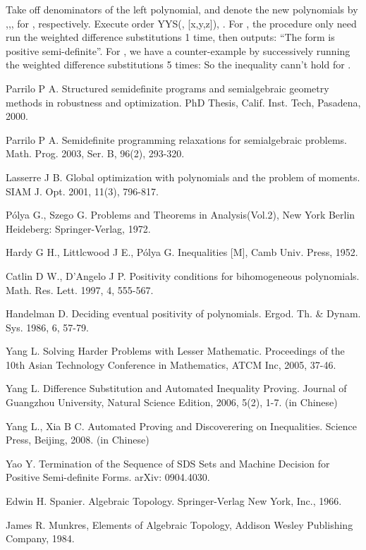 \documentclass [10pt,a4paper]{article}
\begin{document}
Take of\mbox{}f denominators of the left polynomial, and denote the
new polynomials by ,,,  for , respectively. Execute order YYS(, [x,y,z]),
.  For , the procedure only need run
the weighted dif\mbox{}ference substitutions 1 time, then outputs:
``The form  is positive semi-definite''.  For ,  we have a
counter-example by successively running the weighted
dif\mbox{}ference substitutions 5 times:
  So
the  inequality cann't hold for .



\begin{thebibliography}{99}
Parrilo P A. Structured semidefinite programs and semialgebraic
geometry methods in robustness and optimization. PhD Thesis, Calif.
Inst. Tech, Pasadena,  2000.

Parrilo P A. Semidefinite programming relaxations for semialgebraic
problems. Math. Prog.  2003, Ser. B, 96(2), 293-320.

Lasserre J  B.  Global optimization with polynomials and the problem
of moments. SIAM J. Opt. 2001, 11(3), 796-817.

P\'{o}lya G., Szego G. Problems and Theorems in Analysis(Vol.2),
 New York Berlin Heideberg: Springer-Verlag, 1972.

Hardy G H., Littlcwood J E.,  P\'{o}lya G. Inequalities [M], Camb
Univ.  Press, 1952.

 Catlin D W., D'Angelo J P.  Positivity conditions for
bihomogeneous polynomials.  Math. Res. Lett. 1997, 4, 555-567.

 Handelman D. Deciding eventual positivity of polynomials. Ergod. Th. \& Dynam.  Sys. 1986, 6, 57-79.

Yang L. Solving Harder Problems with Lesser Mathematic. Proceedings
of the 10th Asian Technology Conference in Mathematics, ATCM Inc,
2005, 37-46.

Yang L. Difference Substitution and Automated Inequality Proving.
Journal of Guangzhou University, Natural Science Edition, 2006,
5(2), 1-7. (in Chinese)


Yang L., Xia B C.  Automated Proving and Discoverering on Inequalities. Science
Press, Beijing, 2008. (in Chinese)



Yao Y. Termination of the Sequence of SDS Sets and Machine Decision
for Positive Semi-definite Forms.  arXiv: 0904.4030.






Edwin H. Spanier. Algebraic Topology. Springer-Verlag New York,
Inc., 1966.

 James R. Munkres,   Elements of Algebraic Topology,
Addison Wesley Publishing Company, 1984.



\end{thebibliography}
\end{document}
